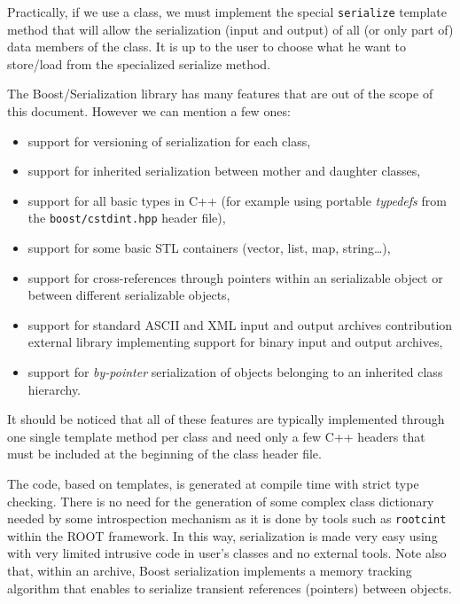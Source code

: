 \documentclass[a4paper,12pt]{article}
\newcommand{\pn}{\par\noindent}
\begin{document}
Practically,  if  we  use  a  class, we  must  implement  the  special
\texttt{serialize} template  method that will  allow the serialization
(input  and output)  of all  (or  only part  of) data  members of  the
class. It is up to the user  to choose what he want to store/load from
the specialized serialize method.

The Boost/Serialization library has many  features that are out of the
scope of this document. However we can mention a few ones:
\begin{itemize}
  
\item support for versioning of serialization for each class,

\item support for inherited  serialization between mother and daughter
  classes,

\item support for  all basic types in C++  (for example using portable
  \emph{typedefs} from the \texttt{boost/cstdint.hpp} header file),

\item support for some basic STL containers (vector, list, map, string\dots),

\item  support   for  cross-references  through   pointers  within  an
  serializable object or between different serializable objects,

\item support  for standard  ASCII and XML  input and  output archives
  contribution external library  implementing support for binary input
  and output archives,

\item support for \emph{by-pointer} serialization of objects belonging to
  an inherited class hierarchy.

\end{itemize}

\pn  It should be  noticed that  all of  these features  are typically
implemented through one single template method per class and need only
a few C++ headers that must  be included at the beginning of the class
header file.

\pn The  code, based on templates,  is generated at  compile time with
strict  type checking. There  is no  need for  the generation  of some
complex class dictionary needed  by some introspection mechanism as it
is  done   by  tools  such   as  \texttt{rootcint}  within   the  ROOT
framework. In  this way,  serialization is made  very easy  using with
very limited intrusive  code in user's classes and  no external tools.
Note also  that, within an  archive, Boost serialization  implements a
memory  tracking   algorithm  that  enables   to  serialize  transient
references (pointers) between objects.
\end{document}
